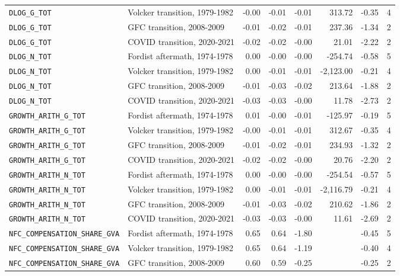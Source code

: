 \begin{landscape}
\begin{longtable}{p{3.4cm}p{3.2cm}rrrrrr}
\\
\nolinkurl{DLOG_G_TOT} & Volcker transition, 1979-1982 & -0.00 & -0.01 & -0.01 & 313.72 & -0.35 & 4
\\
\nolinkurl{DLOG_G_TOT} & GFC transition, 2008-2009 & -0.01 & -0.02 & -0.01 & 237.36 & -1.34 & 2
\\
\nolinkurl{DLOG_G_TOT} & COVID transition, 2020-2021 & -0.02 & -0.02 & -0.00 & 21.01 & -2.22 & 2
\\
\nolinkurl{DLOG_N_TOT} & Fordist aftermath, 1974-1978 & 0.00 & -0.00 & -0.00 & -254.74 & -0.58 & 5
\\
\nolinkurl{DLOG_N_TOT} & Volcker transition, 1979-1982 & 0.00 & -0.01 & -0.01 & -2,123.00 & -0.21 & 4
\\
\nolinkurl{DLOG_N_TOT} & GFC transition, 2008-2009 & -0.01 & -0.03 & -0.02 & 213.64 & -1.88 & 2
\\
\nolinkurl{DLOG_N_TOT} & COVID transition, 2020-2021 & -0.03 & -0.03 & -0.00 & 11.78 & -2.73 & 2
\\
\nolinkurl{GROWTH_ARITH_G_TOT} & Fordist aftermath, 1974-1978 & 0.01 & -0.00 & -0.01 & -125.97 & -0.19 & 5
\\
\nolinkurl{GROWTH_ARITH_G_TOT} & Volcker transition, 1979-1982 & -0.00 & -0.01 & -0.01 & 312.67 & -0.35 & 4
\\
\nolinkurl{GROWTH_ARITH_G_TOT} & GFC transition, 2008-2009 & -0.01 & -0.02 & -0.01 & 234.93 & -1.32 & 2
\\
\nolinkurl{GROWTH_ARITH_G_TOT} & COVID transition, 2020-2021 & -0.02 & -0.02 & -0.00 & 20.76 & -2.20 & 2
\\
\nolinkurl{GROWTH_ARITH_N_TOT} & Fordist aftermath, 1974-1978 & 0.00 & -0.00 & -0.00 & -254.54 & -0.57 & 5
\\
\nolinkurl{GROWTH_ARITH_N_TOT} & Volcker transition, 1979-1982 & 0.00 & -0.01 & -0.01 & -2,116.79 & -0.21 & 4
\\
\nolinkurl{GROWTH_ARITH_N_TOT} & GFC transition, 2008-2009 & -0.01 & -0.03 & -0.02 & 210.62 & -1.86 & 2
\\
\nolinkurl{GROWTH_ARITH_N_TOT} & COVID transition, 2020-2021 & -0.03 & -0.03 & -0.00 & 11.61 & -2.69 & 2
\\
\nolinkurl{NFC_COMPENSATION_SHARE_GVA} & Fordist aftermath, 1974-1978 & 0.65 & 0.64 & -1.80 &  & -0.45 & 5
\\
\nolinkurl{NFC_COMPENSATION_SHARE_GVA} & Volcker transition, 1979-1982 & 0.65 & 0.64 & -1.19 &  & -0.40 & 4
\\
\nolinkurl{NFC_COMPENSATION_SHARE_GVA} & GFC transition, 2008-2009 & 0.60 & 0.59 & -0.25 &  & -0.25 & 2

\end{longtable}
\end{landscape}
